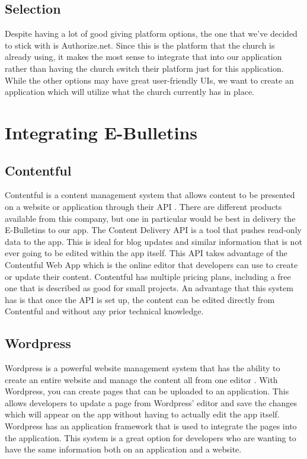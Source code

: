 \documentclass[letterpaper,10pt,draftclsnofoot,onecolumn,titlepage]{IEEEtran}
\begin{document}
	\subsection{Selection}
		Despite having a lot of good giving platform options, the one that we've decided to stick with is Authorize.net.
		Since this is the platform that the church is already using, it makes the most sense to integrate that into our application rather than having the church switch their platform just for this application.
		While the other options may have great user-friendly UIs, we want to create an application which will utilize what the church currently has in place.

	\section{Integrating E-Bulletins}
	\subsection{Contentful}
	Contentful is a content management system that allows content to be presented on a website or application through their API \cite{Contentful}.
	There are different products available from this company, but one in particular would be best in delivery the E-Bulletins to our app.
	The Content Delivery API is a tool that pushes read-only data to the app.
	This is ideal for blog updates and similar information that is not ever going to be edited within the app itself.
	This API takes advantage of the Contentful Web App which is the online editor that developers can use to create or update their content.
	Contentful has multiple pricing plans, including a free one that is described as good for small projects.
	An advantage that this system has is that once the API is set up, the content can be edited directly from Contentful and without any prior technical knowledge.

	\subsection{Wordpress}
	Wordpress is a powerful website management system that has the ability to create an entire website and manage the content all from one editor \cite{Wordpress}.
	With Wordpress, you can create pages that can be uploaded to an application.
	This allows developers to update a page from Wordpress' editor and save the changes which will appear on the app without having to actually edit the app itself.
	Wordpress has an application framework that is used to integrate the pages into the application.
	This system is a great option for developers who are wanting to have the same information both on an application and a website.
\end{document}
